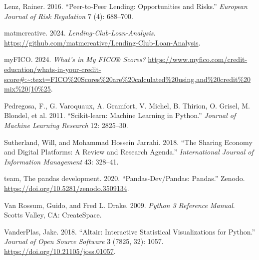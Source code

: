 \documentclass[
  letterpaper,
  DIV=11,
  numbers=noendperiod]{scrartcl}
\newlength{\cslhangindent}
\newenvironment{CSLReferences}[2] %
 {\begin{list}{}{%
  \setlength{\itemindent}{0pt}
  \setlength{\leftmargin}{0pt}
  \setlength{\parsep}{0pt}
  \ifodd #1
   \setlength{\leftmargin}{\cslhangindent}
   \setlength{\itemindent}{-1\cslhangindent}
  \fi
  \setlength{\itemsep}{#2\baselineskip}}}
 {\end{list}}
\begin{document}
\begin{CSLReferences}{1}{0}
Lenz, Rainer. 2016. {``Peer-to-Peer Lending: Opportunities and Risks.''}
\emph{European Journal of Risk Regulation} 7 (4): 688--700.

matmcreative. 2024. \emph{Lending-Club-Loan-Analysis}.
\url{https://github.com/matmcreative/Lending-Club-Loan-Analysis}.

myFICO. 2024. \emph{What's in My FICO® Scores?}
\url{https://www.myfico.com/credit-education/whats-in-your-credit-score\#:~:text=FICO\%20Scores\%20are\%20calculated\%20using,and\%20credit\%20mix\%20(10\%25}.

Pedregosa, F., G. Varoquaux, A. Gramfort, V. Michel, B. Thirion, O.
Grisel, M. Blondel, et al. 2011. {``{Scikit-learn: Machine Learning in
Python}.''} \emph{Journal of Machine Learning Research} 12: 2825--30.

Sutherland, Will, and Mohammad Hossein Jarrahi. 2018. {``The Sharing
Economy and Digital Platforms: A Review and Research Agenda.''}
\emph{International Journal of Information Management} 43: 328--41.

team, The pandas development. 2020. {``Pandas-Dev/Pandas: Pandas.''}
Zenodo. \url{https://doi.org/10.5281/zenodo.3509134}.

Van Rossum, Guido, and Fred L. Drake. 2009. \emph{Python 3 Reference
Manual}. Scotts Valley, CA: CreateSpace.

VanderPlas, Jake. 2018. {``Altair: Interactive Statistical
Visualizations for Python.''} \emph{Journal of Open Source Software} 3
(7825, 32): 1057. \url{https://doi.org/10.21105/joss.01057}.

\end{CSLReferences}
\end{document}
